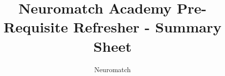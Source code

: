 \documentclass[10pt,a4paper]{article}
\title{Neuromatch Academy Pre-Requisite Refresher - Summary Sheet}
\author{Neuromatch}
\begin{document}

\end{document}
